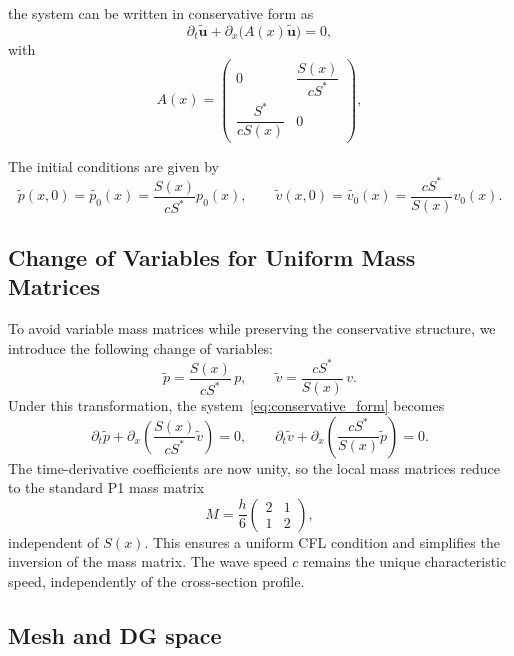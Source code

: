 \documentclass[11pt,a4paper]{report}
\theoremstyle{plain}
\theoremstyle{definition}
\begin{document}
the system can be written in conservative form as
\begin{equation}
\partial_t \mathbf{\tilde{u}} + \partial_x \big( A(x) \mathbf{\tilde{u}} \big) = 0,
\label{eq:conservative_form}
\end{equation}
with
\begin{equation}
A(x) =
\begin{pmatrix}
0 & \dfrac{S(x)}{c S^*} \\
\dfrac{S^*}{c S(x)} & 0
\end{pmatrix},
\end{equation}

The initial conditions are given by
\begin{equation}
\tilde{p}(x,0) = \tilde{p_0}(x) = \frac{S(x)}{c S^\ast} p_0(x), \qquad \tilde{v}(x,0) = \tilde{v_0}(x) = \frac{c S^\ast}{S(x)} v_0(x).
\end{equation}

\subsection{Change of Variables for Uniform Mass Matrices}

To avoid variable mass matrices while preserving the conservative structure,
we introduce the following change of variables:
\begin{equation}
    \tilde{p} = \frac{S(x)}{cS^\ast}\, p, \qquad
    \tilde{v} = \frac{cS^\ast}{S(x)}\, v.
\end{equation}
Under this transformation, the system~\eqref{eq:conservative_form} becomes
\begin{equation}
    \partial_t \tilde{p} + \partial_x\!\left(\frac{S(x)}{cS^\ast}\tilde{v}\right) = 0,
    \qquad
    \partial_t \tilde{v} + \partial_x\!\left(\frac{cS^\ast}{S(x)}\tilde{p}\right) = 0.
\end{equation}
The time-derivative coefficients are now unity, so the local mass matrices reduce to
the standard P1 mass matrix
\begin{equation}
    M = \frac{h}{6}\begin{pmatrix}2&1\\1&2\end{pmatrix},
\end{equation}
independent of $S(x)$. This ensures a uniform CFL condition and simplifies the
inversion of the mass matrix. The wave speed $c$ remains the unique characteristic
speed, independently of the cross-section profile.

\subsection{Mesh and DG space}
\end{document}
